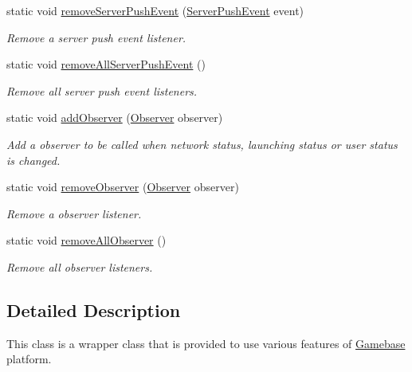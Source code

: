 \begin{DoxyCompactItemize}
static void \hyperlink{classcom_1_1toast_1_1android_1_1gamebase_1_1_gamebase_a1aac5aefec7eee16ab9ca5522c19dd75}{remove\+Server\+Push\+Event} (\hyperlink{interfacecom_1_1toast_1_1android_1_1gamebase_1_1serverpush_1_1_server_push_event}{Server\+Push\+Event} event)
\begin{DoxyCompactList}\small\item\em Remove a server push event listener. \end{DoxyCompactList}\item 
static void \hyperlink{classcom_1_1toast_1_1android_1_1gamebase_1_1_gamebase_ad8565e3001614780831e6f05fa3f9e77}{remove\+All\+Server\+Push\+Event} ()
\begin{DoxyCompactList}\small\item\em Remove all server push event listeners. \end{DoxyCompactList}\item 
static void \hyperlink{classcom_1_1toast_1_1android_1_1gamebase_1_1_gamebase_a9079ec835df5660d8b19a1fd3eb0d9d8}{add\+Observer} (\hyperlink{interfacecom_1_1toast_1_1android_1_1gamebase_1_1observer_1_1_observer}{Observer} observer)
\begin{DoxyCompactList}\small\item\em Add a observer to be called when network status, launching status or user status is changed. \end{DoxyCompactList}\item 
static void \hyperlink{classcom_1_1toast_1_1android_1_1gamebase_1_1_gamebase_af13c08393910fc1b5dac3b5209f461c8}{remove\+Observer} (\hyperlink{interfacecom_1_1toast_1_1android_1_1gamebase_1_1observer_1_1_observer}{Observer} observer)
\begin{DoxyCompactList}\small\item\em Remove a observer listener. \end{DoxyCompactList}\item 
static void \hyperlink{classcom_1_1toast_1_1android_1_1gamebase_1_1_gamebase_a73db608847a6f59086a19b7be9fb0b7f}{remove\+All\+Observer} ()
\begin{DoxyCompactList}\small\item\em Remove all observer listeners. \end{DoxyCompactList}\end{DoxyCompactItemize}


\subsection{Detailed Description}
This class is a wrapper class that is provided to use various features of \hyperlink{classcom_1_1toast_1_1android_1_1gamebase_1_1_gamebase}{Gamebase} platform. 

